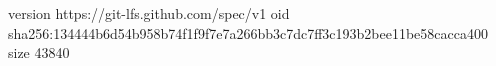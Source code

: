 version https://git-lfs.github.com/spec/v1
oid sha256:134444b6d54b958b74f1f9f7e7a266bb3c7dc7ff3c193b2bee11be58cacca400
size 43840
